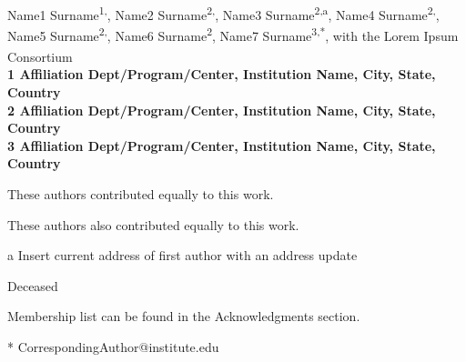 \documentclass[10pt,letterpaper]{article}
\date{}
\begin{document}
\vspace*{0.35in}

\begin{flushleft}
{\Large
\textbf{}
}
\newline
\\
Name1 Surname\textsuperscript{1,\Yinyang},
Name2 Surname\textsuperscript{2,\Yinyang},
Name3 Surname\textsuperscript{2,\textcurrency a},
Name4 Surname\textsuperscript{2,\ddag},
Name5 Surname\textsuperscript{2,\ddag},
Name6 Surname\textsuperscript{2},
Name7 Surname\textsuperscript{3,*},
with the Lorem Ipsum Consortium\textsuperscript{\textpilcrow}
\\
\bigskip
\bf{1} Affiliation Dept/Program/Center, Institution Name, City, State, Country
\\
\bf{2} Affiliation Dept/Program/Center, Institution Name, City, State, Country
\\
\bf{3} Affiliation Dept/Program/Center, Institution Name, City, State, Country
\\
\bigskip

%
%
\Yinyang These authors contributed equally to this work.

\ddag These authors also contributed equally to this work.

\textcurrency a Insert current address of first author with an address update

\dag Deceased

\textpilcrow Membership list can be found in the Acknowledgments section.

* CorrespondingAuthor@institute.edu

\end{flushleft}
\end{document}
